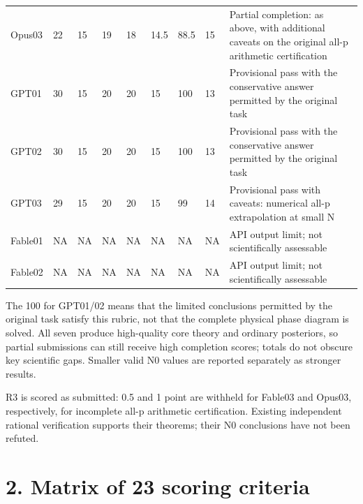 \documentclass[11pt,a4paper]{article}
\begin{document}
{\begin{longtable}
{}Opus03 & 22 & 15 & 19 & 18 & 14.5 & 88.5 & 15 & Partial completion: as above, with additional caveats on the original all-p arithmetic certification\tabularnewline
{}GPT01 & 30 & 15 & 20 & 20 & 15 & 100 & 13 & Provisional pass with the conservative answer permitted by the original task\tabularnewline
{}GPT02 & 30 & 15 & 20 & 20 & 15 & 100 & 13 & Provisional pass with the conservative answer permitted by the original task\tabularnewline
{}GPT03 & 29 & 15 & 20 & 20 & 15 & 99 & 14 & Provisional pass with caveats: numerical all-p extrapolation at small N\tabularnewline
{}Fable01 & NA & NA & NA & NA & NA & NA & NA & API output limit; not scientifically assessable\tabularnewline
{}Fable02 & NA & NA & NA & NA & NA & NA & NA & API output limit; not scientifically assessable\tabularnewline
\bottomrule
\end{longtable}
}

The 100 for GPT01/\allowbreak{}02 means that the limited conclusions permitted by the original task satisfy this rubric, not that the complete physical phase diagram is solved. All seven produce high-quality core theory and ordinary posteriors, so partial submissions can still receive high completion scores; totals do not obscure key scientific gaps. Smaller valid N0 values are reported separately as stronger results.

R3 is scored as submitted: 0.5 and 1 point are withheld for Fable03 and Opus03, respectively, for incomplete all-p arithmetic certification. Existing independent rational verification supports their theorems; their N0 conclusions have not been refuted.

\section*{2. Matrix of 23 scoring criteria}
\end{document}
